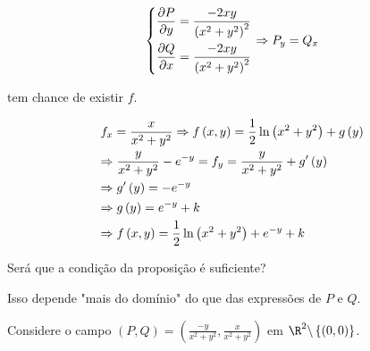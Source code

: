 \documentclass{book}
\begin{document}
\begin{sol}
\[
\left\{ \begin{gathered}
\frac{{\partial P}}
{{\partial y}} = \frac{{ - 2xy}}
{{\left( {x^2  + y^2 } \right)^2 }} \hfill \\
\frac{{\partial Q}}
{{\partial x}} = \frac{{ - 2xy}}
{{\left( {x^2  + y^2 } \right)^2 }} \hfill \\
\end{gathered}  \right. \Rightarrow P_y  = Q_x
\]

tem chance de existir $f$.

\[
\begin{gathered}
f_x  = \frac{x}
{{x^2  + y^2 }} \Rightarrow f\left( {x,y} \right) = \frac{1}
{2}\ln \left( {x^2  + y^2 } \right) + g\left( y \right) \hfill \\
\Rightarrow \frac{y}
{{x^2  + y^2 }} - e^{ - y}  = f_y  = \frac{y}
{{x^2  + y^2 }} + g'\left( y \right) \hfill \\
\Rightarrow g'\left( y \right) =  - e^{ - y}  \hfill \\
\Rightarrow g\left( y \right) = e^{ - y}  + k \hfill \\
\Rightarrow f\left( {x,y} \right) = \frac{1}
{2}\ln \left( {x^2  + y^2 } \right) + e^{ - y}  + k \hfill \\
\end{gathered}
\]

\end{sol}

Ser\'a que a condi\c c\~ao da proposi\c c\~ao \'e suficiente?

Isso depende "mais do dom\'inio" do que das express\~oes de $P$ e $Q$.

\begin{ex}
Considere o campo $\left( {P,Q} \right) = \left( {\frac{{ - y}}
{{x^2  + y^2 }},\frac{x}
{{x^2  + y^2 }}} \right)$ em $\R^2 \backslash \left\{ {\left( {0,0} \right)} \right\}$.
\end{ex}
\end{document}
